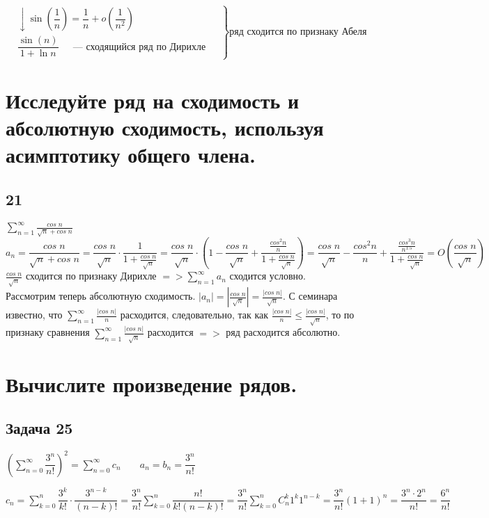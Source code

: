 \documentclass[a4paper,fleqn]{article}
\begin{document}
$	
\left.
\begin{matrix}
&\downarrow \sin\left(\dfrac{1}{n}\right) = \dfrac{1}{n} + o\left(\dfrac{1}{n^2}\right) &\\
&\dfrac{\sin(n) }{1+\ln n} \;\;\;\; \text{ --- сходящийся ряд по Дирихле   }&
\end{matrix} \right\} \text{ряд сходится по признаку Абеля}
$	
    \section*{Исследуйте ряд на сходимость и абсолютную сходимость, используя асимптотику общего члена.}



    \subsection*{21}
    $\displaystyle \sum\limits_{n=1}^{\infty} \frac{cos \; n}{\sqrt{n} + cos \; n}$ \\
    \begin{equation*} a_n = \frac{cos \; n}{\sqrt{n} + cos \; n} = \frac{cos \; n}{\sqrt{n}} \cdot \frac{1}{1+\frac{cos\; n}{\sqrt{n}}} = \frac{cos\; n}{\sqrt{n}} \cdot (1 - \frac{cos\; n}{\sqrt{n}} + \frac{\frac{cos^2n}{n}}{1 + \frac{cos\; n}{\sqrt{n}}}) = \frac{cos\; n}{\sqrt{n}} - \frac{cos^2n}{n} + \frac{\frac{cos^3n}{n^{1.5}}}{1 + \frac{cos\; n}{\sqrt{n}}} = O(\frac{cos \; n}{\sqrt{n}})\end{equation*}
    $\displaystyle \frac{cos \; n}{\sqrt{n}}$ сходится по признаку Дирихле $\displaystyle => \sum\limits_{n=1}^{\infty} a_n$ сходится условно. \\
    Рассмотрим теперь абсолютную сходимость. $\displaystyle |a_n| = \left|\frac{cos \; n}{\sqrt{n}}\right| = \frac{|cos \; n|}{\sqrt{n}}$. С семинара известно, что $\displaystyle \sum\limits_{n = 1}^{\infty} \frac{|cos\; n|}{n}$ расходится, следовательно, так как $\displaystyle \frac{|cos\; n|}{n} \leq \frac{|cos\; n|}{\sqrt{n}}$, то по признаку сравнения $\sum\limits_{n = 1}^{\infty} \frac{|cos\; n|}{\sqrt{n}}$ расходится $\displaystyle =>$ ряд расходится абсолютно. \\


    
    \section*{Вычислите произведение рядов.}

    \subsection*{Задача 25}
	$ \left(\sum_{n = 0}^{\infty}\dfrac{3^n}{n!}\right)^2  = \sum_{n=0}^{\infty} c_n \;\;\;\;\;\;\; a_n = b_n = \dfrac{3^n}{n!}$
	
	$ c_n = \sum_{k=0}^{n} \dfrac{3^k}{k!}\cdot \dfrac{3^{n-k}}{(n-k)!} = \dfrac{3^n}{n!} \sum_{k=0}^{n}\dfrac{n!}{k!(n-k)!} = \dfrac{3^n}{n!}\sum_{k=0}^{n}C_n^k 1^k1^{n-k} = \dfrac{3^n}{n!}(1+1)^n = \dfrac{3^n \cdot 2^n}{n!}  = \dfrac{6^n}{n!}$
	
\end{document}
